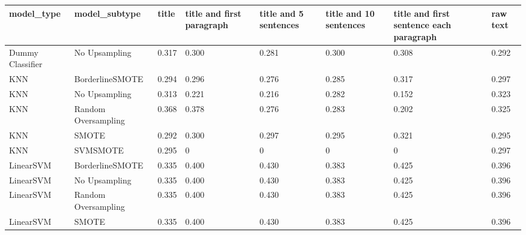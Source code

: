 \begin{tabular}{llllllll}
\toprule
                  model\_type &       model\_subtype & title & title and first paragraph & title and 5 sentences & title and 10 sentences & title and first sentence each paragraph & raw text \\
\midrule
            Dummy Classifier &       No Upsampling & 0.317 &                     0.300 &                 0.281 &                  0.300 &                                   0.308 &    0.292 \\
                         KNN &     BorderlineSMOTE & 0.294 &                     0.296 &                 0.276 &                  0.285 &                                   0.317 &    0.297 \\
                         KNN &       No Upsampling & 0.313 &                     0.221 &                 0.216 &                  0.282 &                                   0.152 &    0.323 \\
                         KNN & Random Oversampling & 0.368 &                     0.378 &                 0.276 &                  0.283 &                                   0.202 &    0.325 \\
                         KNN &               SMOTE & 0.292 &                     0.300 &                 0.297 &                  0.295 &                                   0.321 &    0.295 \\
                         KNN &            SVMSMOTE & 0.295 &                         0 &                     0 &                      0 &                                       0 &    0.297 \\
                   LinearSVM &     BorderlineSMOTE & 0.335 &                     0.400 &                 0.430 &                  0.383 &                                   0.425 &    0.396 \\
                   LinearSVM &       No Upsampling & 0.335 &                     0.400 &                 0.430 &                  0.383 &                                   0.425 &    0.396 \\
                   LinearSVM & Random Oversampling & 0.335 &                     0.400 &                 0.430 &                  0.383 &                                   0.425 &    0.396 \\
                   LinearSVM &               SMOTE & 0.335 &                     0.400 &                 0.430 &                  0.383 &                                   0.425 &    0.396 \\

\end{tabular}
